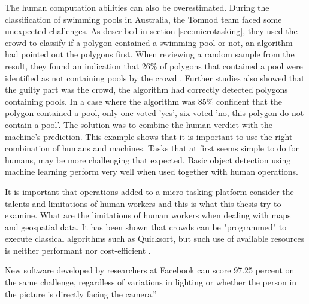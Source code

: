 The human computation abilities can also be overestimated. During the classification of swimming pools in Australia, the Tomnod team faced some unexpected challenges. As described in section \ref{sec:microtasking}, they used the crowd to classify if a polygon contained a swimming pool or not, an algorithm had pointed out the polygons first. When reviewing a random sample from the result, they found an indication that 26\% of polygons that contained a pool were identified as not containing pools by the crowd \citep{Kostas2016}.  Further studies also showed that the guilty part was the crowd, the algorithm had correctly detected polygons containing pools. In a case where the algorithm was 85\% confident that the polygon contained a pool, only one voted 'yes', six voted 'no, this polygon do not contain a pool'. The solution was to combine the human verdict with the machine's prediction. This example shows that it is important to use the right combination of humans and machines. Tasks that at first seems simple to do for humans, may be more challenging that expected.  Basic object detection using machine learning perform very well when used together with human operations. 

It is important that operations added to a micro-tasking platform consider the talents and limitations of human workers \citep{Franklin2011} and this is what this thesis try to examine. What are the limitations of human workers when dealing with maps and geospatial data. It has been shown that crowds can be "programmed" to execute classical algorithms such as Quicksort, but such use of available resources is neither performant nor cost-efficient \citep{Franklin2011}. 


New software developed by researchers at Facebook can score 97.25 percent on the same challenge, regardless of variations in lighting or whether the person in the picture is directly facing the camera.” %

